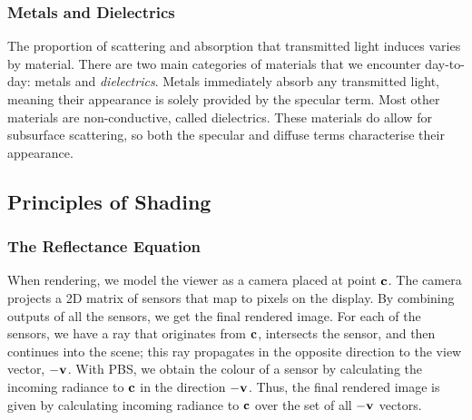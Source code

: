 \subsubsection{Metals and Dielectrics}

The proportion of scattering and absorption that transmitted light induces varies by material. There are two main categories of materials that we encounter day-to-day: metals and \textit{dielectrics}. Metals immediately absorb any transmitted light, meaning their appearance is solely provided by the specular term. Most other materials are non-conductive, called dielectrics. These materials do allow for subsurface scattering, so both the specular and diffuse terms characterise their appearance.

\subsection{Principles of Shading} \label{PrinciplesOfShading}

\subsubsection{The Reflectance Equation}

When rendering, we model the viewer as a camera placed at point \begin{math}\mathbf{c}\end{math}. The camera projects a 2D matrix of sensors that map to pixels on the display. By combining outputs of all the sensors, we get the final rendered image. For each of the sensors, we have a ray that originates from \begin{math}\mathbf{c}\end{math}, intersects the sensor, and then continues into the scene; this ray propagates in the opposite direction to the view vector, \begin{math}\mathbf{-v}\end{math}. With PBS, we obtain the colour of a sensor by calculating the incoming radiance to \begin{math}\mathbf{c}\end{math} in the direction \begin{math}\mathbf{-v}\end{math}. Thus, the final rendered image is given by calculating incoming radiance to \begin{math}\mathbf{c}\end{math} over the set of all \begin{math}\mathbf{-v}\end{math} vectors.

